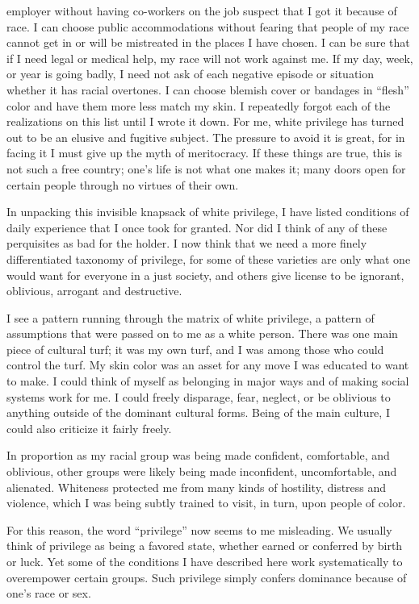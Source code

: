 \documentclass{article}
\begin{document}
employer without having co-workers on the job suspect that I got it because of
race.  I can choose public accommodations without fearing that people of my
race cannot get in or will be mistreated in the places I have chosen.  I can be
sure that if I need legal or medical help, my race will not work against me.
If my day, week, or year is going badly, I need not ask of each negative
episode or situation whether it has racial overtones.  I can choose blemish
cover or bandages in ``flesh'' color and have them more less match my skin.  I
repeatedly forgot each of the realizations on this list until I wrote it down.
For me, white privilege has turned out to be an elusive and fugitive subject.
The pressure to avoid it is great, for in facing it I must give up the myth of
meritocracy. If these things are true, this is not such a free country; one's
life is not what one makes it; many doors open for certain people through no
virtues of their own.

In unpacking this invisible knapsack of white privilege, I have listed
conditions of daily experience that I once took for granted. Nor did I think of
any of these perquisites as bad for the holder. I now think that we need a more
finely differentiated taxonomy of privilege, for some of these varieties are
only what one would want for everyone in a just society, and others give
license to be ignorant, oblivious, arrogant and destructive.

I see a pattern running through the matrix of white privilege, a pattern of
assumptions that were passed on to me as a white person. There was one main
piece of cultural turf; it was my own turf, and I was among those who could
control the turf. My skin color was an asset for any move I was educated to
want to make. I could think of myself as belonging in major ways and of making
social systems work for me. I could freely disparage, fear, neglect, or be
oblivious to anything outside of the dominant cultural forms. Being of the main
culture, I could also criticize it fairly freely.

In proportion as my racial group was being made confident, comfortable, and
oblivious, other groups were likely being made inconfident, uncomfortable, and
alienated. Whiteness protected me from many kinds of hostility, distress and
violence, which I was being subtly trained to visit, in turn, upon people of
color.

For this reason, the word ``privilege'' now seems to me misleading. We usually
think of privilege as being a favored state, whether earned or conferred by
birth or luck. Yet some of the conditions I have described here work
systematically to overempower certain groups. Such privilege simply confers
dominance because of one's race or sex.
\end{document}

